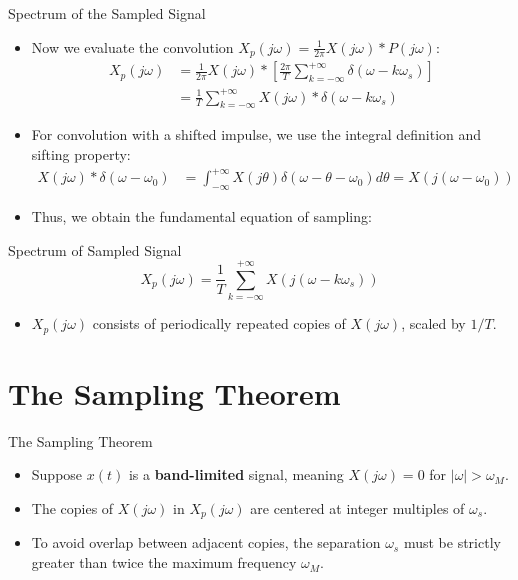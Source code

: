 \begin{frame}{Spectrum of the Sampled Signal}
  \begin{itemize}
    \item Now we evaluate the convolution $X_p(j\omega) = \frac{1}{2\pi} X(j\omega) * P(j\omega)$:
      \begin{align*}
        X_p(j\omega) & = \frac{1}{2\pi} X(j\omega) * \left[ \frac{2\pi}{T} \sum_{k=-\infty}^{+\infty} \delta(\omega - k\omega_s) \right] \\
        & = \frac{1}{T} \sum_{k=-\infty}^{+\infty} X(j\omega) * \delta(\omega - k\omega_s)
      \end{align*}
    \item For convolution with a shifted impulse, we use the integral definition and sifting property:
      \begin{align*}
        X(j\omega) * \delta(\omega - \omega_0) & = \int_{-\infty}^{+\infty} X(j\theta)\delta(\omega - \theta - \omega_0) d\theta = X(j(\omega - \omega_0))
      \end{align*}
    \item Thus, we obtain the fundamental equation of sampling:
  \end{itemize}
  \begin{conceptbox}{Spectrum of Sampled Signal}
    \vspace{-0.2cm}
    \begin{equation*}
      X_p(j\omega) = \frac{1}{T} \sum_{k=-\infty}^{+\infty} X(j(\omega - k\omega_s))
    \end{equation*}
  \end{conceptbox}
  \begin{itemize}
    \item $X_p(j\omega)$ consists of periodically repeated copies of $X(j\omega)$, scaled by $1/T$.
  \end{itemize}
\end{frame}

\section{The Sampling Theorem}

\begin{frame}{The Sampling Theorem}
  \begin{itemize}
    \item Suppose $x(t)$ is a \textbf{band-limited} signal, meaning $X(j\omega) = 0$ for $|\omega| > \omega_M$.
    \item The copies of $X(j\omega)$ in $X_p(j\omega)$ are centered at integer multiples of $\omega_s$.
    \item To avoid overlap between adjacent copies, the separation $\omega_s$ must be strictly greater than twice the maximum frequency $\omega_M$.
  \end{itemize}
\end{frame}

